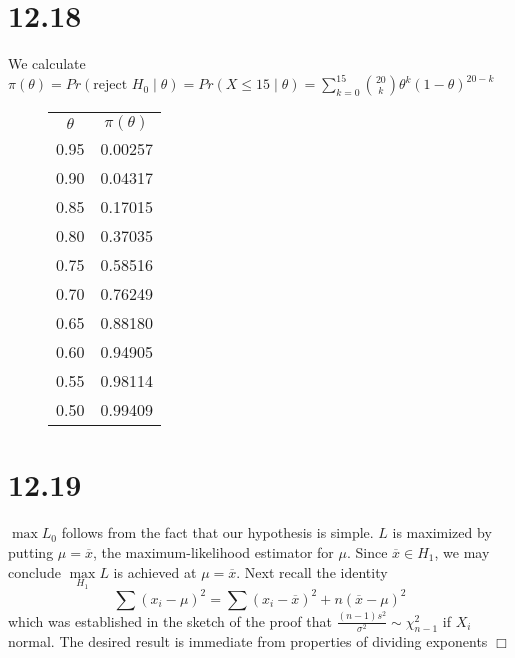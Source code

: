 \documentclass{article}
\begin{document}
\section*{12.18}
We calculate $\pi(\theta) = Pr(\text{reject } H_0 \;|\;\theta) = Pr(X \leqslant 15 \;|\; \theta) = \sum\limits_{k=0}^{15} \binom{20}{k}\theta^k(1-\theta)^{20-k}$
\begin{figure}[ht]
\centering
\begin{minipage}{.5\textwidth}
  \begin{center}
  \begin{tabular}{ c|c }
  $\theta$ & $\pi(\theta)$\\
  \cline{1-2}
  0.95 & 0.00257\\
  0.90 & 0.04317\\
  0.85 & 0.17015\\
  0.80 & 0.37035\\
  0.75 & 0.58516\\
  0.70 & 0.76249\\
  0.65 & 0.88180\\
  0.60 & 0.94905\\
  0.55 & 0.98114\\
  0.50 & 0.99409\\
  \end{tabular}
  \end{center}
  \label{fig:test1}
\end{minipage}%
\begin{minipage}{.5\textwidth}
  \centering
  \label{fig:test2}
\end{minipage}
\end{figure}

\section*{12.19}
$\max L_0$ follows from the fact that our hypothesis is simple. $L$ is maximized by putting $\mu = \overline{x}$, the maximum-likelihood estimator for $\mu$. Since $\overline{x} \in H_1$, we may conclude $\max\limits_{H_1} L$ is achieved at $\mu = \overline{x}$. Next recall the identity
$$\sum (x_i - \mu)^2 = \sum (x_i - \overline{x})^2 + n(\overline{x}-\mu)^2$$
which was established in the sketch of the proof that $\frac{(n-1)s^2}{\sigma^2} \sim \chi^2_{n-1}$ if $X_i$ normal. The desired result is immediate from properties of dividing exponents $\Box$
\end{document}
